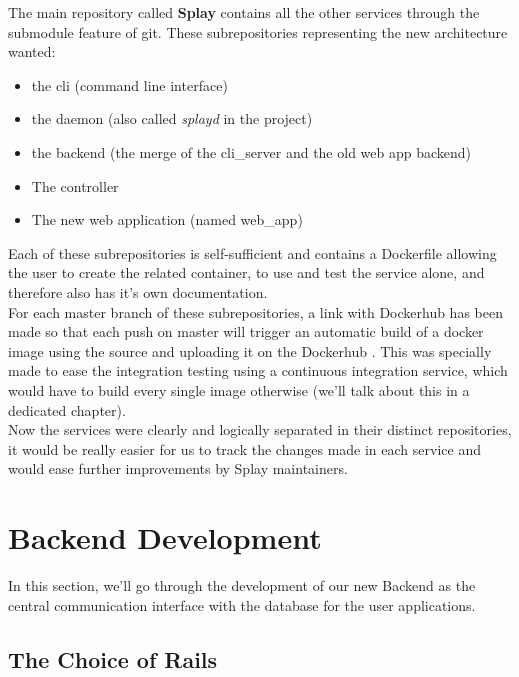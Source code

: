 \documentclass{eplmastersthesis}
\begin{document}
        The main repository called \textbf{Splay} contains all the other services
        through the submodule \cite{GitSubmodules} feature of git. These
        subrepositories representing the new architecture wanted:

        \begin{itemize}
          \item the cli (command line interface)
          \item the daemon (also called \textit{splayd} in the project)
          \item the backend (the merge of the cli\_server and the old web app backend)
          \item The controller
          \item The new web application (named web\_app)
        \end{itemize}

        Each of these subrepositories is self-sufficient and contains a Dockerfile
        allowing the user to create the related container, to use and test
        the service alone, and therefore also has it's own documentation.\\

        For each master branch of these subrepositories, a link with Dockerhub
        has been made so that each push on master will trigger an automatic build
        of a docker image using the source and uploading it on the Dockerhub
        \cite{DockerHubGithub}.
        This was specially made to ease the integration testing using a
        continuous integration service, which would have to build every single
        image otherwise (we'll talk about this in a dedicated chapter).\\

        Now the services were clearly and logically separated in their
        distinct repositories, it would be really easier for us to track
        the changes made in each service and would ease further improvements
        by Splay maintainers.

    \section{Backend Development}

      In this section, we'll go through the development of our new Backend
      as the central communication interface with the database for the user
      applications.\\

      \subsection{The Choice of Rails}
\end{document}
